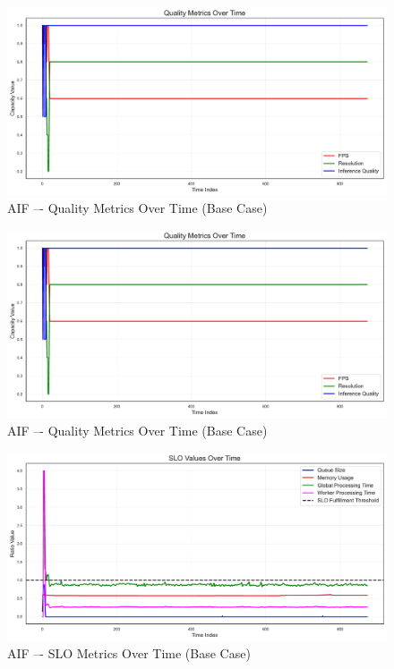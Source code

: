 \begin{figure}[h]
    \centering
    \includegraphics[width=\textwidth]{img/results/basic/active_inference_relative_control_quality_metrics.pdf}
    \caption{AIF –- Quality Metrics Over Time (Base Case)}
\end{figure}
\begin{figure}[h]
    \centering
    \includegraphics[width=\textwidth]{img/results/basic/active_inference_relative_control_quality_metrics.pdf}
    \caption{AIF –- Quality Metrics Over Time (Base Case)}
\end{figure}
\begin{figure}[h]
    \centering
    \includegraphics[width=\textwidth]{img/results/basic/active_inference_relative_control_slo_values.pdf}
    \caption{AIF –- SLO Metrics Over Time (Base Case)}
\end{figure}
